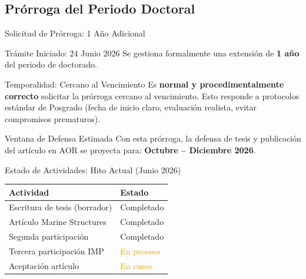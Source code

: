 \documentclass{beamer}
\begin{document}
\subsection{Prórroga del Periodo Doctoral}

\begin{frame}{Solicitud de Prórroga: 1 Año Adicional}
    \small
    \begin{block}{Trámite Iniciado: 24 Junio 2026}
        Se gestiona formalmente una extensión de \textbf{1 año} del periodo de doctorado.
    \end{block}

    \vspace{0.3cm}

    \begin{alertblock}{Temporalidad: Cercano al Vencimiento}
        \footnotesize
        Es \textbf{normal y procedimentalmente correcto} solicitar la prórroga cercano al vencimiento. Esto responde a protocolos estándar de Posgrado (fecha de inicio claro, evaluación realista, evitar compromisos prematuros).
    \end{alertblock}

    \vspace{0.15cm}

    \begin{block}{Ventana de Defensa Estimada}
        Con esta prórroga, la defensa de tesis y publicación del artículo en AOR se proyecta para: \textbf{Octubre -- Diciembre 2026}.
    \end{block}
\end{frame}

\begin{frame}{Estado de Actividades: Hito Actual (Junio 2026)}
    \centering
    \small
    \vspace{0.3cm}
    \begin{tabular}{p{3.8cm}p{2cm}}
        \toprule
        \textbf{Actividad} & \textbf{Estado} \\
        \midrule
        Escritura de tesis (borrador) & \textcolor{green!70}{Completado} \\
        Artículo Marine Structures & \textcolor{green!70}{Completado} \\
        Segunda participación & \textcolor{green!70}{Completado} \\
        Tercera participación IMP & \textcolor{orange}{En proceso} \\
        Aceptación artículo & \textcolor{orange}{En curso} \\
        \bottomrule
    \end{tabular}
\end{frame}
\end{document}
